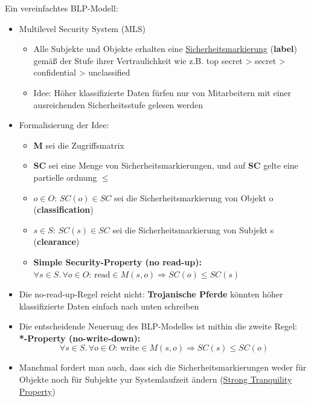 \documentclass[openany]{book}
\begin{document}
Ein vereinfachtes BLP-Modell:
\begin{itemize}
\item Multilevel Security System (MLS)
\begin{itemize}
\item Alle Subjekte und Objekte erhalten eine \underline{Sicherheitsmarkierung} (\textbf{label}) gemäß der Stufe ihrer Vertraulichkeit wie z.B. top secret > secret > confidential > unclassified
\item Idee: Höher klassifizierte Daten fürfen nur von Mitarbeitern mit einer ausreichenden Sicherheitsstufe gelesen werden
\end{itemize}
\item Formalisierung der Idee:
\begin{itemize}
\item \textbf{M} sei die Zugriffsmatrix
\item \textbf{SC} sei eine Menge von Sicherheitsmarkierungen, und auf \textbf{SC} gelte eine partielle ordnung $\leq $
\item $o\in O:\, SC(o)\in SC$ sei die Sicherheitsmarkierung von Objekt o (\textbf{classification})
\item $s\in S: \, SC(s)\in SC$ sei die Sicherheitsmarkierung von Subjekt s (\textbf{clearance}) \\
\item \textbf{Simple Security-Property (no read-up): \\ $\forall s \in S.\, \forall o \in O: \, \text{read}\in M(s,o)\Rightarrow SC(o)\leq SC(s)$}
\end{itemize}
\item Die no-read-up-Regel reicht nicht: \textbf{Trojanische Pferde} könnten höher klassifizierte Daten einfach nach unten schreiben
\item Die entscheidende Neuerung des BLP-Modelles ist mithin die zweite Regel: \\ \textbf{*-Property (no-write-down): $$\forall s\in S.\, \forall o \in O:\, \text{write}\in M(s,o)\Rightarrow SC(s)\leq SC(o)$$}
\item Manchmal fordert man auch, dass sich die Sicherheitsmarkierungen weder für Objekte noch für Subjekte yur Systemlaufzeit ändern (\underline{Strong Tranquility Property})
\end{itemize}
\end{document}
